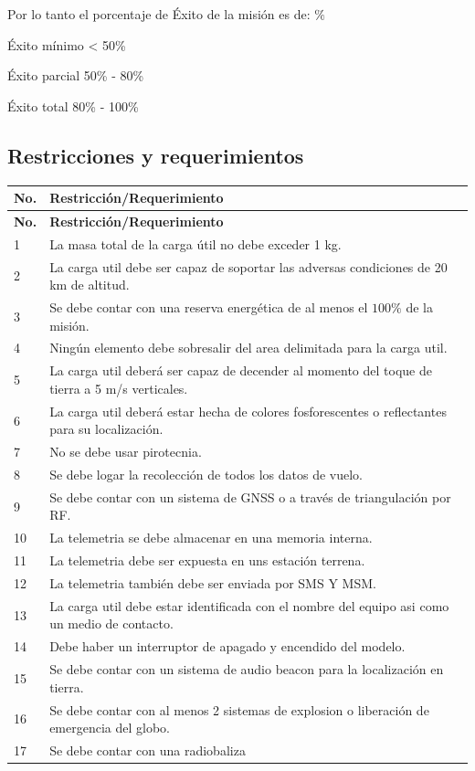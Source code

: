 \documentclass[letterpaper,12pt]{article} %
\begin{document}
    Por lo tanto el porcentaje de Éxito de la misión es de: $\%$

    Éxito mínimo < 50\%

    Éxito parcial 50\% - 80\%

    Éxito total 80\% - 100\%

    \newpage

    \subsection{Restricciones y requerimientos}

    \begin{longtable}{|l|m{15cm}|}
    \hline
    \textbf{No.} & \textbf{Restricción/Requerimiento} \\
    \hline
    \endfirsthead
    \hline
    \textbf{No.} & \textbf{Restricción/Requerimiento} \\
    \hline
    \endhead
    1 & La masa total de la carga útil no debe exceder 1 kg. \\
    \midrule
    2 & La carga util debe ser capaz de soportar las adversas condiciones de 20 km de altitud. \\
    \midrule
    3 & Se debe contar con una reserva energética de al menos el $100\%$ de la misión. \\
    \midrule
    4 & Ningún elemento debe sobresalir del area delimitada para la carga util. \\
    \midrule
    5 & La carga util deberá ser capaz de decender al momento del toque de tierra a 5 m/s verticales. \\
    \midrule
    6 & La carga util deberá estar hecha de colores fosforescentes o reflectantes para su localización. \\
    \midrule
    7 & No se debe usar pirotecnia. \\
    \midrule
    8 & Se debe logar la recolección de todos los datos de vuelo. \\
    \midrule
    9 & Se debe contar con un sistema de GNSS o a través de triangulación por RF. \\
    \midrule
    10 & La telemetria se debe almacenar en una memoria interna. \\
    \midrule
    11 & La telemetria debe ser expuesta en uns estación terrena.   \\
    \midrule
    12 & La telemetria también debe ser enviada por SMS Y MSM. \\
    \midrule
    13 & La carga util debe estar identificada con el nombre del equipo asi como un medio de contacto. \\
    \midrule
    14 & Debe haber un interruptor de apagado y encendido del modelo. \\
    \midrule
    15 & Se debe contar con un sistema de audio beacon para la localización en tierra. \\
    \midrule
    16 & Se debe contar con al menos 2 sistemas de explosion o liberación de emergencia del globo.    \\
    \midrule
    17 & Se debe contar con una radiobaliza \\
    \hline
        
    \end{longtable}
\end{document}
